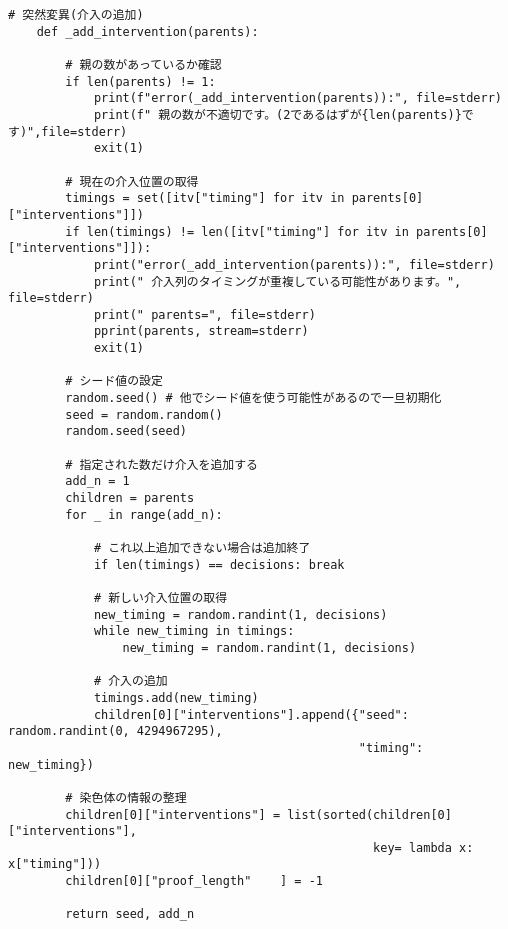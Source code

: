 \begin{lstlisting}[caption=追加の突然変異を行う関数\_add\_intervention]
    # 突然変異(介入の追加)
    def _add_intervention(parents):

        # 親の数があっているか確認
        if len(parents) != 1:
            print(f"error(_add_intervention(parents)):", file=stderr)
            print(f" 親の数が不適切です。(2であるはずが{len(parents)}です)",file=stderr)
            exit(1)

        # 現在の介入位置の取得
        timings = set([itv["timing"] for itv in parents[0]["interventions"]])
        if len(timings) != len([itv["timing"] for itv in parents[0]["interventions"]]):
            print("error(_add_intervention(parents)):", file=stderr)
            print(" 介入列のタイミングが重複している可能性があります。", file=stderr)
            print(" parents=", file=stderr)
            pprint(parents, stream=stderr)
            exit(1)

        # シード値の設定
        random.seed() # 他でシード値を使う可能性があるので一旦初期化
        seed = random.random()
        random.seed(seed)

        # 指定された数だけ介入を追加する
        add_n = 1
        children = parents
        for _ in range(add_n):

            # これ以上追加できない場合は追加終了
            if len(timings) == decisions: break

            # 新しい介入位置の取得
            new_timing = random.randint(1, decisions)
            while new_timing in timings:
                new_timing = random.randint(1, decisions)

            # 介入の追加
            timings.add(new_timing)
            children[0]["interventions"].append({"seed": random.randint(0, 4294967295),
                                                 "timing": new_timing})
            
        # 染色体の情報の整理
        children[0]["interventions"] = list(sorted(children[0]["interventions"],
                                                   key= lambda x: x["timing"]))
        children[0]["proof_length"    ] = -1

        return seed, add_n
\end{lstlisting}

